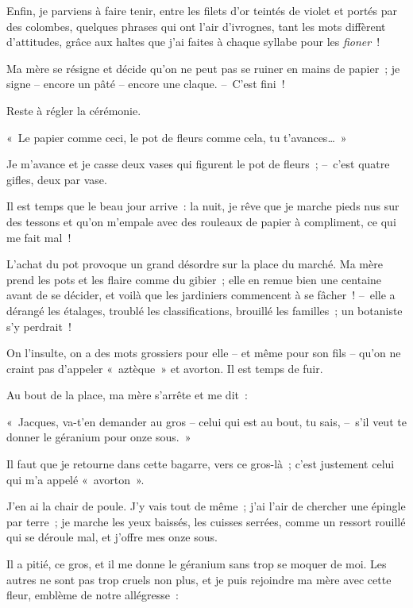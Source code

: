 \documentclass[french,twoside]{book} %
\begin{document}
Enfin, je parviens à faire tenir, entre les filets d’or teintés de violet et portés par des colombes, quelques phrases qui ont l’air d’ivrognes, tant les mots diffèrent d’attitudes, grâce aux haltes que j’ai faites à chaque syllabe pour les \emph{fioner} !\par
Ma mère se résigne et décide qu’on ne peut pas se ruiner en mains de papier ; je signe – encore un pâté – encore une claque. – C’est fini !\par
Reste à régler la cérémonie.\par
« Le papier comme ceci, le pot de fleurs comme cela, tu t’avances… »\par
Je m’avance et je casse deux vases qui figurent le pot de fleurs ; – c’est quatre gifles, deux par vase.\par
\bigbreak
\noindent Il est temps que le beau jour arrive : la nuit, je rêve que je marche pieds nus sur des tessons et qu’on m’empale avec des rouleaux de papier à compliment, ce qui me fait mal !\par
L’achat du pot provoque un grand désordre sur la place du marché. Ma mère prend les pots et les flaire comme du gibier ; elle en remue bien une centaine avant de se décider, et voilà que les jardiniers commencent à se fâcher ! – elle a dérangé les étalages, troublé les classifications, brouillé les familles ; un botaniste s’y perdrait !\par
On l’insulte, on a des mots grossiers pour elle – et même pour son fils – qu’on ne craint pas d’appeler « aztèque » et avorton. Il est temps de fuir.\par
Au bout de la place, ma mère s’arrête et me dit :\par
« Jacques, va-t’en demander au gros – celui qui est au bout, tu sais, – s’il veut te donner le géranium pour onze sous. »\par
Il faut que je retourne dans cette bagarre, vers ce gros-là ; c’est justement celui qui m’a appelé « avorton ».\par
J’en ai la chair de poule. J’y vais tout de même ; j’ai l’air de chercher une épingle par terre ; je marche les yeux baissés, les cuisses serrées, comme un ressort rouillé qui se déroule mal, et j’offre mes onze sous.\par
Il a pitié, ce gros, et il me donne le géranium sans trop se moquer de moi. Les autres ne sont pas trop cruels non plus, et je puis rejoindre ma mère avec cette fleur, emblème de notre allégresse :\par
\end{document}

